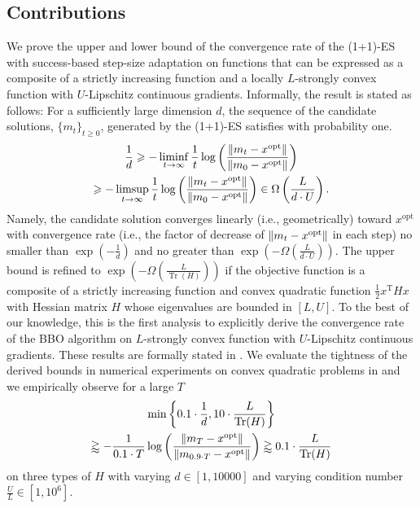 \documentclass[journal]{IEEEtran}
\providecommand{\limsup}{\operatornamewithlimits{limsup}} %
\providecommand{\liminf}{\operatornamewithlimits{liminf}} %
\DeclareMathOperator{\Tr}{Tr}     %
\renewcommand{\geq}{\geqslant} %
\DeclarePairedDelimiter{\norm}{\lVert}{\rVert}
\theoremstyle{definition}
\begin{document}

\subsection{Contributions}

We prove the upper and lower bound of the convergence rate of the (1+1)-ES with success-based step-size adaptation on functions that can be expressed as a composite of a strictly increasing function and a locally $L$-strongly convex function with $U$-Lipschitz continuous gradients. 
Informally, the result is stated as follows: For a sufficiently large dimension $d$, the sequence of the candidate solutions, $\{m_t\}_{t \geq 0}$, generated by the (1+1)-ES satisfies with probability one.
\begin{multline}
    \frac{1}{d} 
    \geq - \liminf_{t\to\infty} \frac{1}{t}\log\left(\frac{\norm{m_t - x^\mathrm{opt}}}{\norm{m_0 - x^\mathrm{opt}}}\right) 
    \\
    \geq - \limsup_{t\to\infty} \frac{1}{t}\log\left(\frac{\norm{m_t - x^\mathrm{opt}}}{\norm{m_0 - x^\mathrm{opt}}}\right) 
    \in \Omega\left(\frac{L}{d\cdot U}\right). 
\end{multline}
Namely, the candidate solution converges linearly (i.e., geometrically) toward $x^\mathrm{opt}$ with convergence rate (i.e., the factor of decrease of $\norm{m_t - x^\mathrm{opt}}$ in each step) no smaller than $\exp\left(-\frac{1}{d}\right)$ and no greater than $\exp\left(-\Omega\left(\frac{L}{d\cdot U}\right)\right)$. The upper bound is refined to $\exp\left(-\Omega\left(\frac{L}{\Tr(H)}\right)\right)$ if the objective function is a composite of a strictly increasing function and convex quadratic function $\frac{1}{2} x^\mathrm{T} H x$ with Hessian matrix $H$ whose eigenvalues are bounded in $[L, U]$. To the best of our knowledge, this is the first analysis to explicitly derive the convergence rate of the BBO algorithm on $L$-strongly convex function with $U$-Lipschitz continuous gradients. These results are formally stated in . We evaluate the tightness of the derived bounds in numerical experiments on convex quadratic problems in  and we empirically observe for a large $T$
\begin{multline}
    \min\left\{ 0.1 \cdot \frac{1}{d} , 10 \cdot \frac{L}{\Tr(H)} \right\}
    \\
    \gtrapprox - \frac{1}{0.1 \cdot T}\log\left(\frac{\norm{m_{T} - x^\mathrm{opt}}}{\norm{m_{0.9 \cdot T} - x^\mathrm{opt}}}\right) 
    \gtrapprox 0.1 \cdot \frac{L}{\Tr(H)} 
\end{multline}
on three types of $H$ with varying $d \in [1, 10000]$ and varying condition number $\frac{U}{L} \in [1, 10^6]$. 
\end{document}
